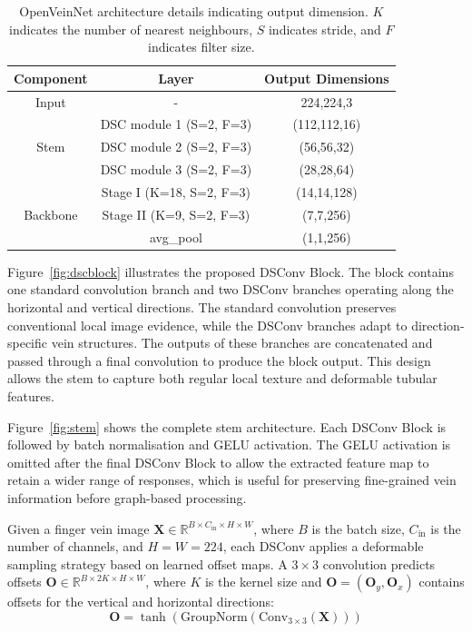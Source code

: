 \documentclass[10pt,journal,compsoc]{IEEEtran}
\begin{document}
\begin{table}[hbt!]
    \centering
    \begin{tabular}{| c | c | c |}
         \hline
          Component & Layer & Output Dimensions \\
         \hline
         \hline
         Input & - & 224,224,3 \\
         \hline
                & DSC module 1 (S=2, F=3) & (112,112,16) \\
        Stem    & DSC module 2 (S=2, F=3) & (56,56,32) \\
                & DSC module 3 (S=2, F=3) & (28,28,64) \\
         \hline
                    & Stage I (K=18, S=2, F=3) & (14,14,128) \\
        Backbone    & Stage II (K=9, S=2, F=3) & (7,7,256) \\
                    & avg\_pool & (1,1,256) \\
         \hline
    \end{tabular}

    \medskip
    \caption{OpenVeinNet architecture details indicating output dimension. $K$ indicates the number of nearest neighbours, $S$ indicates stride, and $F$ indicates filter size.}
    \label{tab:dims}
\end{table}

Figure~\ref{fig:dscblock} illustrates the proposed DSConv Block. The block contains one standard convolution branch and two DSConv branches operating along the horizontal and vertical directions. The standard convolution preserves conventional local image evidence, while the DSConv branches adapt to direction-specific vein structures. The outputs of these branches are concatenated and passed through a final convolution to produce the block output. This design allows the stem to capture both regular local texture and deformable tubular features.

Figure~\ref{fig:stem} shows the complete stem architecture. Each DSConv Block is followed by batch normalisation and GELU activation. The GELU activation is omitted after the final DSConv Block to allow the extracted feature map to retain a wider range of responses, which is useful for preserving fine-grained vein information before graph-based processing.

Given a finger vein image $\bm{X} \in \mathbb{R}^{B \times C_{\text{in}} \times H \times W}$, where $B$ is the batch size, $C_{\text{in}}$ is the number of channels, and $H = W = 224$, each DSConv applies a deformable sampling strategy based on learned offset maps. A \(3 \times 3\) convolution predicts offsets \(\bm{O} \in \mathbb{R}^{B \times 2K \times H \times W}\), where \(K\) is the kernel size and \(\bm{O} = (\bm{O}_y, \bm{O}_x)\) contains offsets for the vertical and horizontal directions:
\begin{equation}
    \bm{O} = \tanh(\mathrm{GroupNorm}(\mathrm{Conv}_{3 \times 3}(\bm{X})))
\end{equation}
\end{document}
